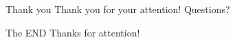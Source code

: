 \documentclass[10pt]{beamer}
\begin{document}
\begin{frame}{Thank you}
	\centering
	Thank you for your attention!
	\vfill
	Questions?
\end{frame}



\begin{frame}{The END}
\centering
	Thanks for attention!
\end{frame}
	
\end{document}
